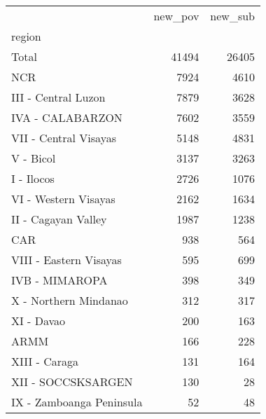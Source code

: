 \begin{tabular}{lrr}
\toprule
{} &  new\_pov &  new\_sub \\
region                   &          &          \\
\midrule
Total                    &    41494 &    26405 \\
NCR                      &     7924 &     4610 \\
III - Central Luzon      &     7879 &     3628 \\
IVA - CALABARZON         &     7602 &     3559 \\
VII - Central Visayas    &     5148 &     4831 \\
V - Bicol                &     3137 &     3263 \\
I - Ilocos               &     2726 &     1076 \\
VI - Western Visayas     &     2162 &     1634 \\
II - Cagayan Valley      &     1987 &     1238 \\
CAR                      &      938 &      564 \\
VIII - Eastern Visayas   &      595 &      699 \\
IVB - MIMAROPA           &      398 &      349 \\
X - Northern Mindanao    &      312 &      317 \\
XI - Davao               &      200 &      163 \\
ARMM                     &      166 &      228 \\
XIII - Caraga            &      131 &      164 \\
XII - SOCCSKSARGEN       &      130 &       28 \\
IX - Zamboanga Peninsula &       52 &       48 \\
\bottomrule
\end{tabular}
